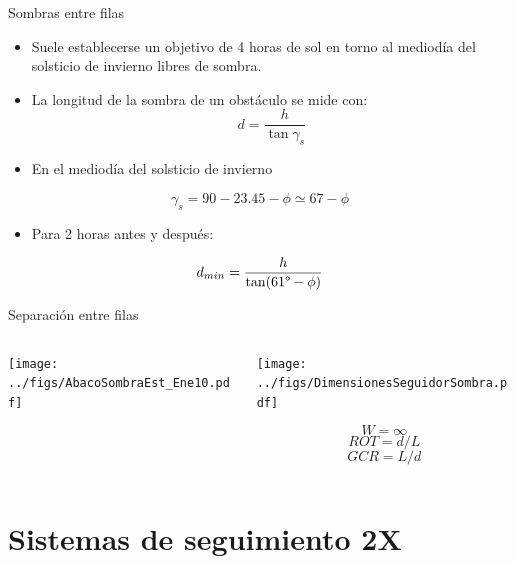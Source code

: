 \documentclass[aspectratio=169, usenames,svgnames,dvipsnames]{beamer}
\begin{document}
\begin{frame}[label={sec:org3ce531b}]{Sombras entre filas}
\begin{itemize}
\item Suele establecerse un objetivo de \alert{4 horas de sol en torno al mediodía del solsticio de invierno libres de sombra}.

\item La longitud de la sombra de un obstáculo se mide con:$$d=\frac{h}{\tan\gamma_{s}}$$

\item En el mediodía del solsticio de invierno
\end{itemize}
$$\gamma_{s}=90-23.45-\phi\simeq67-\phi$$ 

\begin{itemize}
\item Para 2 horas antes y después:
\end{itemize}
$$d_{min}=\frac{h}{\tan(61\degree-\phi)}$$
\end{frame}
\begin{frame}[label={sec:org43e3033}]{Separación entre filas}
\begin{columns}
\begin{column}{0.65\columnwidth}
\begin{center}
\texttt{[image: ../figs/AbacoSombraEst\_Ene10.pdf]}
\end{center}
\end{column}



\begin{column}{0.35\columnwidth}
\begin{center}
\texttt{[image: ../figs/DimensionesSeguidorSombra.pdf]}
\end{center}

\[
W=\infty\]
\[
  ROT=d/L
\]
\[
  GCR=L/d
\]
\end{column}
\end{columns}
\end{frame}


\section{Sistemas de seguimiento 2X}
\label{sec:org1c42e1d}
\end{document}
